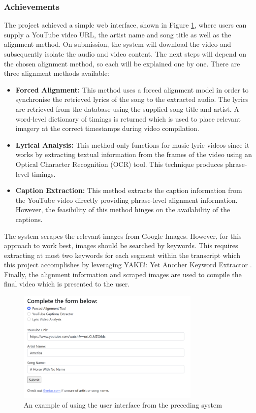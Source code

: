 \documentclass{l4proj}
\begin{document}
\subsubsection{Achievements}
The project achieved a simple web interface, shown in Figure \ref{fig:parker_interface}, where users can supply a YouTube video URL, the artist name and song title as well as the alignment method. On submission, the system will download the video and subsequently isolate the audio and video content. The next steps will depend on the chosen alignment method, so each will be explained one by one. There are three alignment methods available:
\begin{itemize}
    \item \textbf{Forced Alignment:} This method uses a forced alignment model in order to synchronise the retrieved lyrics of the song to the extracted audio. The lyrics are retrieved from the \cite{genius} database using the supplied song title and artist. A word-level dictionary of timings is returned which is used to place relevant imagery at the correct timestamps during video compilation.

    \item \textbf{Lyrical Analysis:} This method only functions for music lyric videos since it works by extracting textual information from the frames of the video using an Optical Character Recognition (OCR) tool. This technique produces phrase-level timings.

    \item \textbf{Caption Extraction:} This method extracts the caption information from the YouTube video directly providing phrase-level alignment information. However, the feasibility of this method hinges on the availability of the captions.
\end{itemize}

The system scrapes the relevant images from Google Images. However, for this approach to work best, images should be searched by keywords. This requires extracting at most two keywords for each segment within the transcript which this project accomplishes by leveraging YAKE!: Yet Another Keyword Extractor \citep{campos2020yake}. Finally, the alignment information and scraped images are used to compile the final video which is presented to the user.

\begin{figure}[H]
    \centering
    \includegraphics[width=0.8\textwidth]{figures/parker_interface.pdf}
    \caption{An example of using the user interface from the preceding system}
    \label{fig:parker_interface}
\end{figure}
\end{document}
